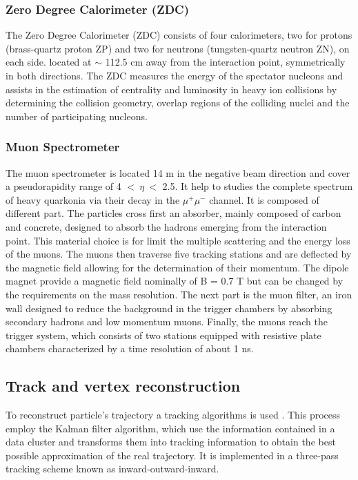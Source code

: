 \documentclass[12pt,a4paper]{book}
\begin{document}
	\subsubsection{Zero Degree Calorimeter (ZDC)}
	The Zero Degree Calorimeter (ZDC) consists of four calorimeters, two for protons (brass-quartz proton ZP) and two for neutrons (tungsten-quartz neutron ZN), on each side. located at $\sim$ 112.5 cm away from the interaction point,	symmetrically in both directions. The ZDC measures the energy of the spectator nucleons and assists in the estimation of centrality and luminosity in heavy ion collisions by determining the collision geometry, overlap regions of the colliding nuclei and the number of participating nucleons.\cite{Padhan:2924203} \cite{amsdottorato9036}	
	
	\subsubsection{Muon Spectrometer}
	The muon spectrometer is located 14 m in the negative beam direction and cover a pseudorapidity range of 4 $<\ \eta\ <$ 2.5. It help to studies the complete spectrum of heavy quarkonia via their decay in the $\mu^+ \mu^-$ channel. It is composed of different part. The particles cross first an absorber, mainly composed of carbon and concrete, designed to absorb the hadrons emerging from the interaction point. This material choice is for limit the multiple scattering and the energy loss of the muons. The muons then traverse five tracking stations and are deflected by the magnetic field allowing for the determination of their momentum. The dipole magnet provide a magnetic field nominally of B = 0.7 T but can be changed by the requirements on the mass resolution. The next part is the muon filter, an iron wall designed to reduce the background in the trigger chambers by absorbing secondary hadrons and low momentum muons. Finally, the muons reach the trigger system, which consists of two stations equipped with resistive plate chambers characterized by a time resolution of about 1 ns.
	\cite{Padhan:2924203} \cite{Alicemuonspectometer} \cite{Herrmann:2920632}
	
\subsection{Track and vertex reconstruction} 

To reconstruct particle's trajectory a tracking algorithms is used \cite{Cheng:2908766}.  This process employ the Kalman filter algorithm, which use the information contained in a data cluster and transforms them into tracking information to obtain the best possible approximation of the real trajectory. It is implemented in a three-pass tracking scheme known as inward-outward-inward. 
\end{document}
